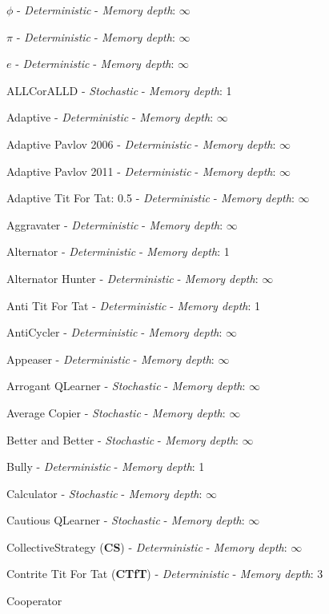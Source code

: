 \item $\phi$
 - \textit{Deterministic} - \textit{Memory depth}: \(\infty\)\item $\pi$
 - \textit{Deterministic} - \textit{Memory depth}: \(\infty\)\item $e$
 - \textit{Deterministic} - \textit{Memory depth}: \(\infty\)\item ALLCorALLD
 - \textit{Stochastic} - \textit{Memory depth}: 1\item Adaptive
 - \textit{Deterministic} - \textit{Memory depth}: \(\infty\)\item Adaptive Pavlov 2006
 - \textit{Deterministic} - \textit{Memory depth}: \(\infty\)\item Adaptive Pavlov 2011
 - \textit{Deterministic} - \textit{Memory depth}: \(\infty\)\item Adaptive Tit For Tat: 0.5
 - \textit{Deterministic} - \textit{Memory depth}: \(\infty\)\item Aggravater
 - \textit{Deterministic} - \textit{Memory depth}: \(\infty\)\item Alternator
 - \textit{Deterministic} - \textit{Memory depth}: 1\item Alternator Hunter
 - \textit{Deterministic} - \textit{Memory depth}: \(\infty\)\item Anti Tit For Tat
 - \textit{Deterministic} - \textit{Memory depth}: 1\item AntiCycler
 - \textit{Deterministic} - \textit{Memory depth}: \(\infty\)\item Appeaser
 - \textit{Deterministic} - \textit{Memory depth}: \(\infty\)\item Arrogant QLearner
 - \textit{Stochastic} - \textit{Memory depth}: \(\infty\)\item Average Copier
 - \textit{Stochastic} - \textit{Memory depth}: \(\infty\)\item Better and Better
 - \textit{Stochastic} - \textit{Memory depth}: \(\infty\)\item Bully
 - \textit{Deterministic} - \textit{Memory depth}: 1\item Calculator
 - \textit{Stochastic} - \textit{Memory depth}: \(\infty\)\item Cautious QLearner
 - \textit{Stochastic} - \textit{Memory depth}: \(\infty\)\item CollectiveStrategy
(\textbf{CS}) - \textit{Deterministic} - \textit{Memory depth}: \(\infty\)\item Contrite Tit For Tat
(\textbf{CTfT}) - \textit{Deterministic} - \textit{Memory depth}: 3\item Cooperator
